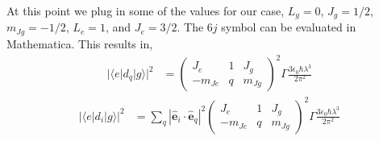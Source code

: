 \documentclass[11pt,letter]{article}
\newcommand{\bv}[1]{\ensuremath{\bm{#1}}}
\begin{document}
At this point we plug in some of the values for our case, $L_{g}=0$, $J_{g} =
1/2$, $m_{Jg}=-1/2$, $L_{e}=1$, and $J_{e}=3/2$.  The $6j$ symbol can be
evaluated in Mathematica.  This results in, 
\begin{align}
|\langle e | d_{q} | g \rangle|^{2} & = \begin{pmatrix} J_{e} & 1 & J_{g} \\ -m_{Je} & q & m_{Jg} \end{pmatrix}^{2}
\Gamma\frac{ 3\epsilon_{0} \hbar \lambda^{3}}{2 \pi^{2}}
\end{align}
\begin{align}
|\langle e | d_{i} | g \rangle|^{2} & =  \sum_{q} |\bv{\hat{e}}_{i}\cdot \bv{\hat{e}}_{q}|^{2} \begin{pmatrix} J_{e} & 1 & J_{g} \\ -m_{Je} & q & m_{Jg} \end{pmatrix}^{2}
\Gamma\frac{ 3\epsilon_{0} \hbar \lambda^{3}}{2 \pi^{2}}
\end{align}
\end{document}
